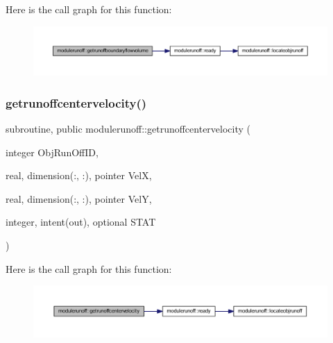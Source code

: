 Here is the call graph for this function\+:\nopagebreak
\begin{figure}[H]
\begin{center}
\leavevmode
\includegraphics[width=350pt]{namespacemodulerunoff_a3a9224ad169d37f7fdb8eb535513d1b1_cgraph}
\end{center}
\end{figure}
\mbox{\label{namespacemodulerunoff_af29a57ef10a724fc9c8e0a4f1f22339e}} 
\subsubsection{\texorpdfstring{getrunoffcentervelocity()}{getrunoffcentervelocity()}}
{\footnotesize\ttfamily subroutine, public modulerunoff\+::getrunoffcentervelocity (\begin{DoxyParamCaption}\item[{integer}]{Obj\+Run\+Off\+ID,  }\item[{real, dimension(\+:, \+:), pointer}]{VelX,  }\item[{real, dimension(\+:, \+:), pointer}]{VelY,  }\item[{integer, intent(out), optional}]{S\+T\+AT }\end{DoxyParamCaption})}

Here is the call graph for this function\+:\nopagebreak
\begin{figure}[H]
\begin{center}
\leavevmode
\includegraphics[width=350pt]{namespacemodulerunoff_af29a57ef10a724fc9c8e0a4f1f22339e_cgraph}
\end{center}
\end{figure}
\mbox{\label{namespacemodulerunoff_a9d8c0b3cb553adb36c76cde2d6bcaef7}} 
